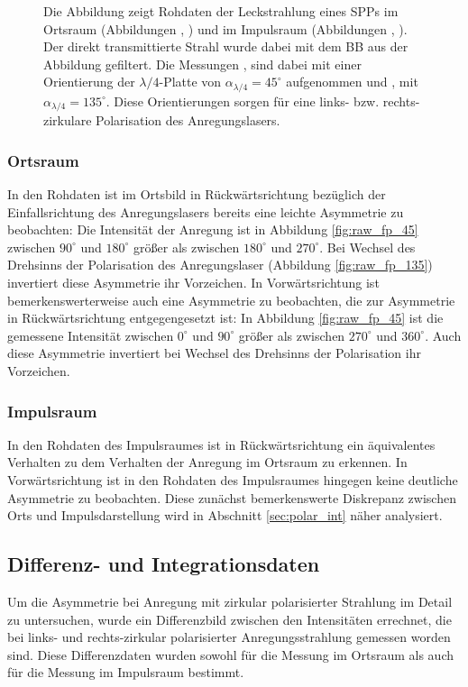 \documentclass[a4paper, titlepage,  ngerman, fullpage]{book}
\begin{document}
\begin{figure}
\begin{subfigure}{0.5\textwidth}
		\end{subfigure}
		\caption[Rohdaten PSHE]{Die Abbildung zeigt Rohdaten der Leckstrahlung eines SPPs im Ortsraum (Abbildungen , ) und im Impulsraum (Abbildungen , ). Der direkt transmittierte Strahl wurde dabei mit dem BB aus der Abbildung gefiltert. Die Messungen ,  sind dabei mit einer Orientierung der $\lambda / 4$-Platte von $\alpha_{\lambda/4} = 45^\circ$ aufgenommen und ,  mit $\alpha_{\lambda/4} = 135^\circ$. Diese Orientierungen sorgen für eine links- bzw. rechts-zirkulare Polarisation des Anregungslasers.}
		\label{fig:measure_pshe_raw}			
	\end{figure}
	\subsubsection{Ortsraum}
	In den Rohdaten ist im Ortsbild in Rückwärtsrichtung bezüglich der Einfallsrichtung des Anregungslasers bereits eine leichte Asymmetrie zu beobachten: Die Intensität der Anregung ist in Abbildung \ref{fig:raw_fp_45} zwischen $90^\circ$ und $180^\circ$ größer als zwischen $180^\circ$ und $270^\circ$. Bei Wechsel des Drehsinns der Polarisation des Anregungslaser (Abbildung \ref{fig:raw_fp_135}) invertiert diese Asymmetrie ihr Vorzeichen. In Vorwärtsrichtung ist bemerkenswerterweise auch eine Asymmetrie zu beobachten, die zur Asymmetrie in Rückwärtsrichtung entgegengesetzt ist: In Abbildung \ref{fig:raw_fp_45} ist die gemessene Intensität zwischen $0^\circ$ und $90^\circ$ größer als zwischen $270^\circ$ und $360^\circ$. Auch diese Asymmetrie invertiert bei Wechsel des Drehsinns der Polarisation ihr Vorzeichen. 
	\subsubsection{Impulsraum} 
	In den Rohdaten des Impulsraumes ist in Rückwärtsrichtung ein äquivalentes Verhalten zu dem Verhalten der Anregung im Ortsraum zu erkennen. In Vorwärtsrichtung ist in den Rohdaten des Impulsraumes hingegen keine deutliche Asymmetrie zu beobachten. Diese zunächst bemerkenswerte Diskrepanz zwischen Orts und Impulsdarstellung wird in Abschnitt \ref{sec:polar_int} näher analysiert.
	\subsection{Differenz- und Integrationsdaten}
		Um die Asymmetrie bei Anregung mit zirkular polarisierter Strahlung im Detail zu untersuchen, wurde ein Differenzbild zwischen den Intensitäten errechnet, die bei links- und rechts-zirkular polarisierter Anregungsstrahlung gemessen worden sind. Diese Differenzdaten wurden sowohl für die Messung im Ortsraum als auch für die Messung im Impulsraum bestimmt.			
\end{document}
